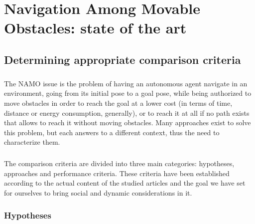 
\chapter{Navigation Among Movable Obstacles: state of the art} %

\label{Chapter2} %

\section{Determining appropriate comparison criteria}

\paragraph{} The NAMO issue is the problem of having an autonomous agent navigate in an environment, going from its initial pose to a goal pose, while being authorized to move obstacles in order to reach the goal at a lower cost (in terms of time, distance or energy consumption, generally), or to reach it at all if no path exists that allows to reach it without moving obstacles. Many approaches exist to solve this problem, but each answers to a different context, thus the need to characterize them.

\paragraph{} The comparison criteria are divided into three main categories: hypotheses, approaches and performance criteria. These criteria have been established according to the actual content of the studied articles and the goal we have set for ourselves to bring social and dynamic considerations in it.

\subsection{Hypotheses}

